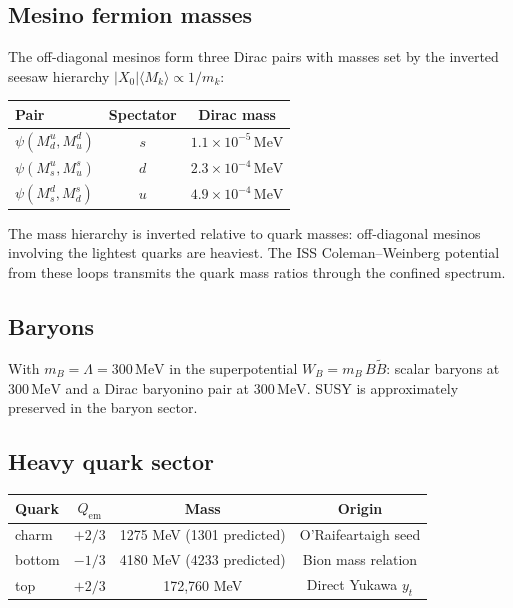 \documentclass[12pt,a4paper]{article}
\newcommand{\MeV}{\,\text{MeV}}
\begin{document}
\subsection{Mesino fermion masses}

The off-diagonal mesinos form three Dirac pairs with masses set by
the inverted seesaw hierarchy $|X_0|\langle M_k\rangle \propto 1/m_k$:

\begin{center}
\begin{tabular}{lcc}
\toprule
Pair & Spectator & Dirac mass \\
\midrule
$\psi(M^u_d, M^d_u)$ & $s$ & $1.1 \times 10^{-5}\MeV$ \\
$\psi(M^u_s, M^s_u)$ & $d$ & $2.3 \times 10^{-4}\MeV$ \\
$\psi(M^d_s, M^s_d)$ & $u$ & $4.9 \times 10^{-4}\MeV$ \\
\bottomrule
\end{tabular}
\end{center}

The mass hierarchy is inverted relative to quark masses: off-diagonal
mesinos involving the lightest quarks are heaviest. The ISS
Coleman--Weinberg potential from these loops transmits the quark mass
ratios through the confined spectrum.

\subsection{Baryons}

With $m_B = \Lambda = 300\MeV$ in the superpotential
$W_B = m_B\,B\tilde{B}$:
scalar baryons at $300\MeV$ and a Dirac baryonino pair at $300\MeV$.
SUSY is approximately preserved in the baryon sector.

\subsection{Heavy quark sector}

\begin{center}
\begin{tabular}{lccc}
\toprule
Quark & $Q_{\text{em}}$ & Mass & Origin \\
\midrule
charm & $+2/3$ & 1275 MeV (1301 predicted) & O'Raifeartaigh seed \\
bottom & $-1/3$ & 4180 MeV (4233 predicted) & Bion mass relation \\
top & $+2/3$ & 172,760 MeV & Direct Yukawa $y_t$ \\
\bottomrule
\end{tabular}
\end{center}
\end{document}
